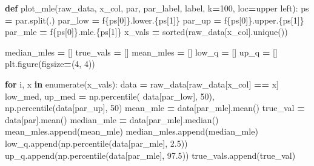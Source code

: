 \documentclass[
]{article}
\newenvironment{Shaded}{\begin{snugshade}}{\end{snugshade}}
\newcommand{\BuiltInTok}[1]{#1}
\newcommand{\ControlFlowTok}[1]{\textcolor[rgb]{0.13,0.29,0.53}{\textbf{#1}}}
\newcommand{\DecValTok}[1]{\textcolor[rgb]{0.00,0.00,0.81}{#1}}
\newcommand{\FloatTok}[1]{\textcolor[rgb]{0.00,0.00,0.81}{#1}}
\newcommand{\KeywordTok}[1]{\textcolor[rgb]{0.13,0.29,0.53}{\textbf{#1}}}
\newcommand{\NormalTok}[1]{#1}
\newcommand{\OperatorTok}[1]{\textcolor[rgb]{0.81,0.36,0.00}{\textbf{#1}}}
\newcommand{\SpecialCharTok}[1]{\textcolor[rgb]{0.00,0.00,0.00}{#1}}
\newcommand{\SpecialStringTok}[1]{\textcolor[rgb]{0.31,0.60,0.02}{#1}}
\newcommand{\StringTok}[1]{\textcolor[rgb]{0.31,0.60,0.02}{#1}}
\theoremstyle{definition}
\theoremstyle{plain}
\theoremstyle{definition}
\theoremstyle{definition}
\theoremstyle{definition}
\theoremstyle{definition}
\theoremstyle{remark}
\begin{document}
\begin{Shaded}
\begin{Highlighting}[]
\KeywordTok{def}\NormalTok{ plot\_mle(raw\_data, x\_col, par, par\_label, label, k}\OperatorTok{=}\DecValTok{100}\NormalTok{, loc}\OperatorTok{=}\StringTok{\textquotesingle{}upper left\textquotesingle{}}\NormalTok{):}
\NormalTok{  ps }\OperatorTok{=}\NormalTok{ par.split(}\StringTok{\textquotesingle{}.\textquotesingle{}}\NormalTok{)}
\NormalTok{  par\_low }\OperatorTok{=} \SpecialStringTok{f\textquotesingle{}}\SpecialCharTok{\{ps}\NormalTok{[}\DecValTok{0}\NormalTok{]}\SpecialCharTok{\}}\SpecialStringTok{.lower.}\SpecialCharTok{\{ps}\NormalTok{[}\DecValTok{1}\NormalTok{]}\SpecialCharTok{\}}\SpecialStringTok{\textquotesingle{}}
\NormalTok{  par\_up }\OperatorTok{=} \SpecialStringTok{f\textquotesingle{}}\SpecialCharTok{\{ps}\NormalTok{[}\DecValTok{0}\NormalTok{]}\SpecialCharTok{\}}\SpecialStringTok{.upper.}\SpecialCharTok{\{ps}\NormalTok{[}\DecValTok{1}\NormalTok{]}\SpecialCharTok{\}}\SpecialStringTok{\textquotesingle{}}
\NormalTok{  par\_mle }\OperatorTok{=} \SpecialStringTok{f\textquotesingle{}}\SpecialCharTok{\{ps}\NormalTok{[}\DecValTok{0}\NormalTok{]}\SpecialCharTok{\}}\SpecialStringTok{.mle.}\SpecialCharTok{\{ps}\NormalTok{[}\DecValTok{1}\NormalTok{]}\SpecialCharTok{\}}\SpecialStringTok{\textquotesingle{}}
\NormalTok{  x\_vals }\OperatorTok{=} \BuiltInTok{sorted}\NormalTok{(raw\_data[x\_col].unique())}

\NormalTok{  median\_mles }\OperatorTok{=}\NormalTok{ []}
\NormalTok{  true\_vals }\OperatorTok{=}\NormalTok{ []}
\NormalTok{  mean\_mles }\OperatorTok{=}\NormalTok{ []}
\NormalTok{  low\_q }\OperatorTok{=}\NormalTok{ []}
\NormalTok{  up\_q }\OperatorTok{=}\NormalTok{ []}
\NormalTok{  plt.figure(figsize}\OperatorTok{=}\NormalTok{(}\DecValTok{4}\NormalTok{, }\DecValTok{4}\NormalTok{))}

  \ControlFlowTok{for}\NormalTok{ i, x }\KeywordTok{in} \BuiltInTok{enumerate}\NormalTok{(x\_vals):}
\NormalTok{    data }\OperatorTok{=}\NormalTok{ raw\_data[raw\_data[x\_col] }\OperatorTok{==}\NormalTok{ x]}
\NormalTok{    low\_med, up\_med }\OperatorTok{=}\NormalTok{ np.percentile(}
\NormalTok{      data[par\_low], }\DecValTok{50}\NormalTok{), np.percentile(data[par\_up], }\DecValTok{50}\NormalTok{)}
\NormalTok{    mean\_mle }\OperatorTok{=}\NormalTok{ data[par\_mle].mean()}
\NormalTok{    true\_val }\OperatorTok{=}\NormalTok{ data[par].mean()}
\NormalTok{    median\_mle }\OperatorTok{=}\NormalTok{ data[par\_mle].median()}
\NormalTok{    mean\_mles.append(mean\_mle)}
\NormalTok{    median\_mles.append(median\_mle)}
\NormalTok{    low\_q.append(np.percentile(data[par\_mle], }\FloatTok{2.5}\NormalTok{))}
\NormalTok{    up\_q.append(np.percentile(data[par\_mle], }\FloatTok{97.5}\NormalTok{))}
\NormalTok{    true\_vals.append(true\_val)}


\end{Highlighting}
\end{Shaded}
\end{document}
